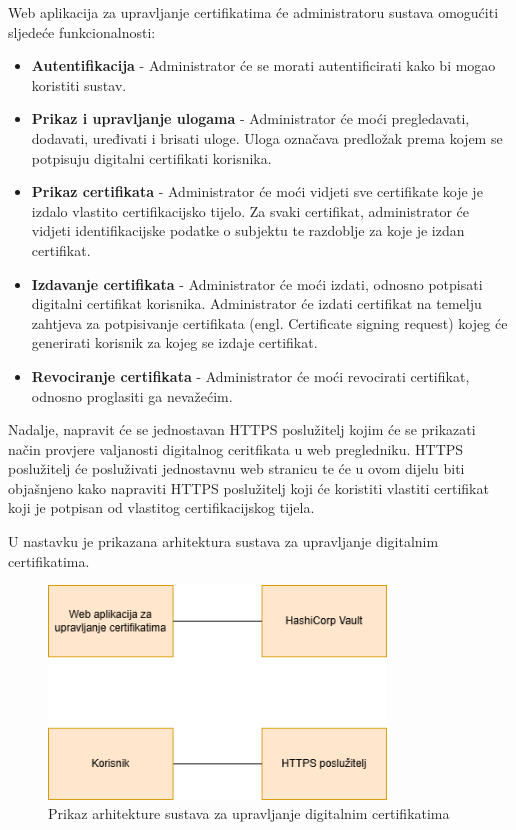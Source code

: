 \documentclass[]{foi}
\begin{document}
Web aplikacija za upravljanje certifikatima će administratoru sustava omogućiti sljedeće funkcionalnosti:
\begin{itemize}
    \item \textbf{Autentifikacija} - Administrator će se morati autentificirati kako bi mogao koristiti sustav.
    \item \textbf{Prikaz i upravljanje ulogama} - Administrator će moći pregledavati, dodavati, uređivati i brisati uloge.
          Uloga označava predložak prema kojem se potpisuju digitalni certifikati korisnika.
    \item \textbf{Prikaz certifikata} - Administrator će moći vidjeti sve certifikate koje je izdalo vlastito certifikacijsko tijelo.
          Za svaki certifikat, administrator će vidjeti identifikacijske podatke o subjektu te razdoblje za koje je izdan certifikat.
    \item \textbf{Izdavanje certifikata} - Administrator će moći izdati, odnosno potpisati digitalni certifikat korisnika.
          Administrator će izdati certifikat na temelju zahtjeva za potpisivanje certifikata (engl. Certificate signing request) kojeg će generirati korisnik za kojeg se izdaje certifikat.
    \item \textbf{Revociranje certifikata} - Administrator će moći revocirati certifikat, odnosno proglasiti ga nevažećim.
\end{itemize}

Nadalje, napravit će se jednostavan HTTPS poslužitelj kojim će se prikazati način provjere valjanosti digitalnog ceritfikata u web pregledniku.
HTTPS poslužitelj će posluživati jednostavnu web stranicu te će u ovom dijelu biti objašnjeno kako napraviti HTTPS poslužitelj koji će koristiti 
vlastiti certifikat koji je potpisan od vlastitog certifikacijskog tijela.

\pagebreak

U nastavku je prikazana arhitektura sustava za upravljanje digitalnim certifikatima.

\begin{figure}[htbp]
  \centering
  \includegraphics[width=0.8\textwidth]{assets/arhitektura.png}
  \caption{Prikaz arhitekture sustava za upravljanje digitalnim certifikatima}
\end{figure}
\end{document}
